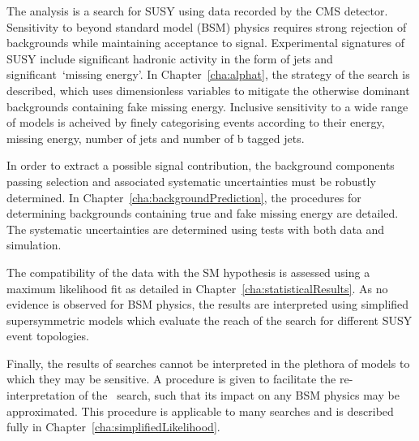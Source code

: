 The \alphat analysis is a search for SUSY using data recorded by the CMS detector. 
Sensitivity to beyond standard model (BSM) physics requires strong rejection of backgrounds while
maintaining acceptance to signal. Experimental signatures of SUSY include significant
hadronic activity in the form of jets and significant~`missing energy'. 
In Chapter~\ref{cha:alphat}, the strategy of the \alphat search is described, which uses
dimensionless variables to mitigate the otherwise dominant backgrounds containing fake missing energy.
Inclusive sensitivity to a wide range of models is acheived by finely categorising events according to 
their energy, missing energy, number of jets and number of b tagged jets.

In order to extract a possible signal contribution, the background components passing selection 
and associated systematic uncertainties must be robustly determined. In Chapter~\ref{cha:backgroundPrediction},
the procedures for determining backgrounds containing true and fake missing
energy are detailed. The systematic uncertainties are determined using tests with 
both data and simulation. 

The compatibility of the data with the SM hypothesis is assessed using a maximum likelihood fit 
as detailed in Chapter~\ref{cha:statisticalResults}. As no evidence is observed for BSM physics,
the results are interpreted using simplified supersymmetric models which evaluate the reach
of the search for different SUSY event topologies. 

Finally, the results of searches cannot be interpreted in the plethora of models to which 
they may be sensitive. A procedure is given to facilitate the re-interpretation
of the \alphat~search, such that its impact on any BSM physics may be approximated.
This procedure is applicable to many searches and is described fully in 
Chapter~\ref{cha:simplifiedLikelihood}.

